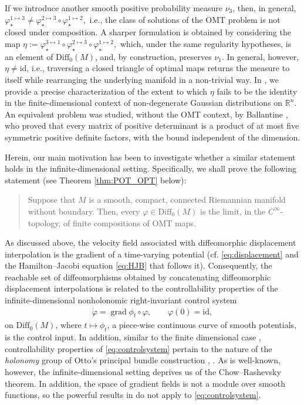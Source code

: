 \documentclass{article}
\theoremstyle{remark}
\newcommand{\M}{M}
\newcommand{\Diff}{\mathrm{Diff}_0(\M)}
\DeclareMathOperator{\grad}{\mathrm{grad}}
\begin{document}
If we introduce another smooth positive probability measure $\nu_3$, then, in general,
%
$
\varphi^{1\mapsto3}_\star \neq \varphi^{2\mapsto3}_\star\circ\varphi^{1\mapsto2}_\star,
$
%
i.e., the class of solutions of the OMT problem is not closed under composition. A sharper formulation is obtained by considering the map
%
$
    \eta :=\varphi^{3\mapsto1}_\star \circ \varphi^{2\mapsto3}_\star\circ\varphi^{1\mapsto2}_\star,
$
%
which, under the same regularity hypotheses, is an element of $\Diff$, and, by construction, preserves $\nu_1$. In general, however, $\eta\neq \mathrm{id}$, i.e., traversing a closed triangle of optimal maps returns the measure to itself while rearranging the underlying manifold in a non-trivial way. In \cite{AbdelgalilGeorgiou2024,AbdelgalilGeorgiou2025,AbdelgalilGeorgiou2026}, we provide a precise characterization of the extent to which $\eta$ fails to be the identity in the finite-dimensional context of non-degenerate Gaussian distributions on $\mathbb{R}^n$. An equivalent problem was studied, without the OMT context, by Ballantine \cite{Ballantine1970}, who proved that every matrix of positive determinant is a product of at most five symmetric positive definite
factors, with the bound independent of the dimension.

Herein, our main motivation has been to investigate whether a
similar statement holds in the infinite-dimensional setting. Specifically, we shall prove the following statement (see Theorem \ref{thm:POT_OPT} below):
%
\begin{quote}
Suppose that $\M$ is a smooth, compact, connected Riemannian manifold without boundary. Then, every
$\varphi \in \Diff$ is the limit, in the $C^\infty$-topology, of finite compositions of OMT maps.
\end{quote}
As discussed above, the velocity field associated with diffeomorphic displacement interpolation is the gradient of a time-varying potential (cf.
\eqref{eq:displacement} and the Hamilton--Jacobi equation \eqref{eq:HJB} that follows it). Consequently, the reachable set of diffeomorphisms obtained by concatenating diffeomorphic displacement interpolations is related to the controllability properties of the infinite-dimensional nonholonomic right-invariant control system
%
\begin{align}\label{eq:controlsystem}
    \dot{\varphi} = \grad\phi_{t} \circ \varphi,
    \qquad \varphi(0) = \mathrm{id},
\end{align}
%
on $\Diff$, where $t\mapsto\phi_{t}$, a piece-wise continuous curve of smooth potentials, is the control input. In addition, similar to the finite dimensional case \cite{AbdelgalilGeorgiou2025}, controllability properties of \eqref{eq:controlsystem} pertain to the nature of the \emph{holonomy} group of Otto's principal bundle construction \cite{otto2001geometry}, \cite[Appendix A.5]{WendtKhesin2009}. As is well-known, however, the infinite-dimensional setting deprives us of the Chow--Rashevsky theorem. In addition, the space of gradient fields is not a module over smooth functions, so the powerful results in \cite{AgrachevCaponigro2009,ArguillereTrelat2017} do not apply to \eqref{eq:controlsystem}. 
\end{document}
